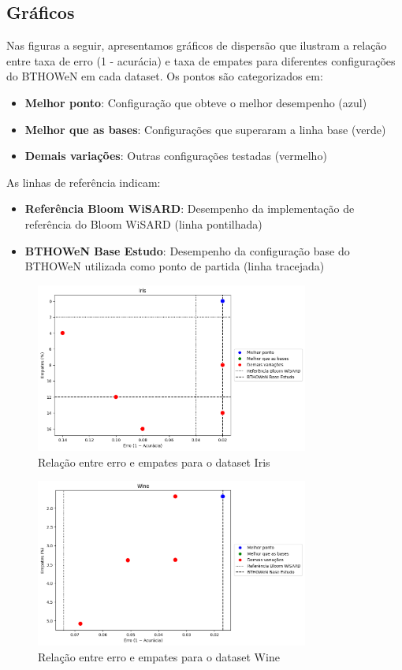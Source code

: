 \documentclass{article}
\begin{document}
\subsection{Gráficos}

Nas figuras a seguir, apresentamos gráficos de dispersão que ilustram a relação entre taxa de erro (1 - acurácia) e taxa de empates para diferentes configurações do BTHOWeN em cada dataset. Os pontos são categorizados em:

\begin{itemize}
  \item \textbf{Melhor ponto}: Configuração que obteve o melhor desempenho (azul)
  \item \textbf{Melhor que as bases}: Configurações que superaram a linha base (verde)
  \item \textbf{Demais variações}: Outras configurações testadas (vermelho)
\end{itemize}

As linhas de referência indicam:
\begin{itemize}
  \item \textbf{Referência Bloom WiSARD}: Desempenho da implementação de referência do Bloom WiSARD (linha pontilhada)
  \item \textbf{BTHOWeN Base Estudo}: Desempenho da configuração base do BTHOWeN utilizada como ponto de partida (linha tracejada)
\end{itemize}


\begin{figure}[H]
\centering
\includegraphics[width=0.8\textwidth]{figures/image1.png}
\caption{Relação entre erro e empates para o dataset Iris}
\label{fig:iris}
\end{figure}

\begin{figure}[H]
\centering
\includegraphics[width=0.8\textwidth]{figures/image3.png}
\caption{Relação entre erro e empates para o dataset Wine}
\label{fig:wine}
\end{figure}
\end{document}
